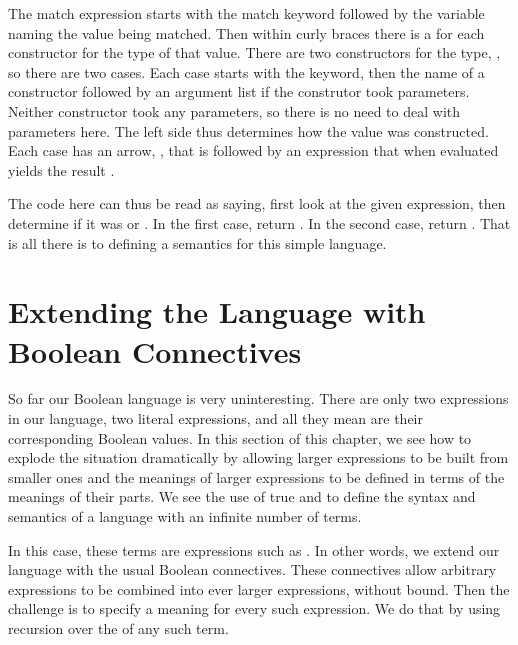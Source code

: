 \documentclass[letterpaper,10pt,english]{sphinxmanual}
\begin{document}
The match expression starts with the match keyword followed by the
variable naming the value being matched. Then within curly braces
there is a  for each constructor for the type of that value.
There are two constructors for the type, , so there are two
cases. Each case starts with the  keyword, then the name of a
constructor followed by an argument list if the construtor took
parameters. Neither constructor took any parameters, so there is no
need to deal with parameters here. The left side thus determines how
the value was constructed. Each case has an arrow, \sphinxstyleemphasis{=\textgreater{}}, that is
followed by an expression that when evaluated yields the result .

The code here can thus be read as saying, first look at the given
expression, then determine if it was  or . In the first
case, return . In the second case, return . That is all
there is to defining a semantics for this simple language.


\section{Extending the Language with Boolean Connectives}
\label{\detokenize{10-formal-languages:extending-the-language-with-boolean-connectives}}
So far our Boolean language is very uninteresting. There are only two
expressions in our language, two literal expressions, and all they
mean are their corresponding Boolean values. In this section of this
chapter, we see how to explode the situation dramatically by allowing
larger expressions to be built from smaller ones and the meanings of
larger expressions to be defined in terms of the meanings of their
parts. We see the use of true  and  to define the syntax and semantics of a language with an
infinite number of terms.

In this case, these terms are expressions such as . In other words, we extend our language with the usual
Boolean connectives. These connectives allow arbitrary expressions to
be combined into ever larger expressions, without bound. Then the
challenge is to specify a meaning for every such expression.  We do
that by using recursion over the  of any such term.
\end{document}
